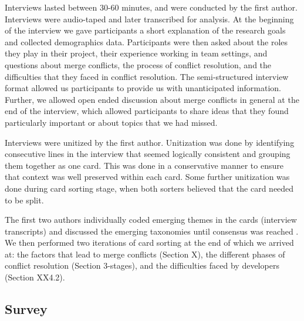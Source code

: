 Interviews lasted between 30-60 minutes, and were conducted by the first author. Interviews were audio-taped and later transcribed for analysis. At the beginning of the interview we gave participants a short explanation of the research goals and collected demographics data. Participants were then asked about the roles they play in their project, their experience working in team settings, and questions about merge conflicts, the process of conflict resolution, and the difficulties that they faced in conflict resolution. The semi-structured interview format allowed us participants to provide us with unanticipated information. Further, we allowed open ended discussion about merge conflicts in general at the end of the interview, which allowed participants to share ideas that they found particularly important or about topics that we had missed. 


Interviews were unitized \cite{unitization} by the first author. Unitization was done by identifying consecutive lines in the interview that seemed logically consistent and grouping them together as one card. This was done in a conservative manner to ensure that context was well preserved within each card. Some further unitization was done during card sorting stage, when both sorters believed that the card needed to be split.


The first two authors individually coded emerging themes in the cards (interview transcripts) and discussed the emerging taxonomies until consensus was reached \cite{card_sort}. We then performed two iterations of card sorting at the end of which we arrived at: the factors that lead to merge conflicts (Section X), the different phases of conflict resolution (Section 3-stages), and the difficulties faced by developers (Section XX4.2).


\subsection{Survey}

